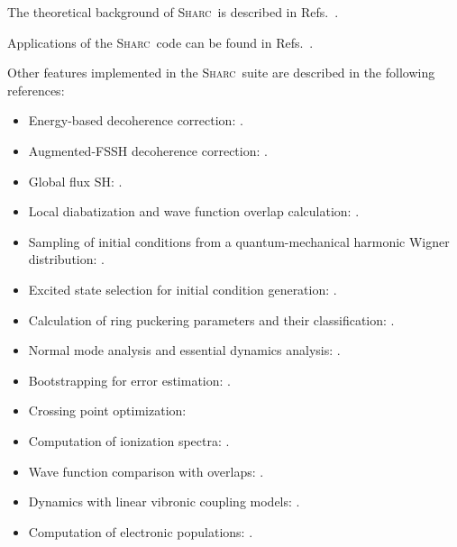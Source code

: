 \documentclass[a4paper,10pt,DIV=15,openany]{scrbook}
\newcommand{\sharc}{\textsc{Sharc}}
\begin{document}
The theoretical background of \sharc\ is described in Refs.~\cite{Richter2011JCTC, Richter2012JCTC_erratum, Bajo2012JPCA, Marquetand2011FD, Mai2015IJQC, Mai2018WCMS, Mai2018}.

Applications of the \sharc\ code can be found in Refs.~\cite{Richter2012JPCL, Mai2013C, Mai2014TCC, Mai2014JCP_SO2, Gonzalez2014, Richter2014PCCP,Martinez-Fernandez2014JCTC, Corrales2014PCCP, Crespo-Hernandez2015JACS, Marazzi2016JPCL, Richter2016JCTC, Cao2016CP, Banerjee2016PCCP, Mai2016JPCL, Mai2016NC, Peccati2016PTRSA, Murillo-Sanchez2017CPL, Borin2017PCCP, Mai2017CP, Siouri2017JPCA, Bellshaw2017CPL, Sun2017JPCA, Rauer2016JACS, Atkins2017JPCL, Schnappinger2017PCCP, Mai2017JCP, Zobel2018CEJ, Rauer2018MC, Cao2018JMS, Squibb2018NC}.

Other features implemented in the \sharc\ suite are described in the following references:
\begin{itemize}
  \item Energy-based decoherence correction: \cite{Granucci2007JCP}.
  \item Augmented-FSSH decoherence correction: \cite{Jain2016JCTC}.
  \item Global flux SH: \cite{Wang2014JCTC}.
  \item Local diabatization and wave function overlap calculation: \cite{Granucci2001JCP, Plasser2012JCP, Plasser2016JCTC}.
  \item Sampling of initial conditions from a quantum-mechanical harmonic Wigner distribution: \cite{Dahl1988JCP, Schinke1995, Barbatti2016IJQC}.
  \item Excited state selection for initial condition generation: \cite{Barbatti2007JPPA}.
  \item Calculation of ring puckering parameters and their classification: \cite{Cremer1975JACS, Boeyens1976JCMS}.
  \item Normal mode analysis \cite{Kurtz2001JCP,Plasser2009} and essential dynamics analysis: \cite{Amadei1993PSFB,Plasser2009}.
  \item Bootstrapping for error estimation: \cite{Nangia2004JCP}.
  \item Crossing point optimization: \cite{Bearpark1994CPL, Levine2008JPCB}
  \item Computation of ionization spectra: \cite{Ruckenbauer2016SR,Ruckenbauer2016JCP}.
  \item Wave function comparison with overlaps: \cite{Plasser2016JCP}.
  \item Dynamics with linear vibronic coupling models: \cite{Plasser2018PCCP}.
  \item Computation of electronic populations: \cite{Landry2013JCP}.
\end{itemize}
\end{document}
